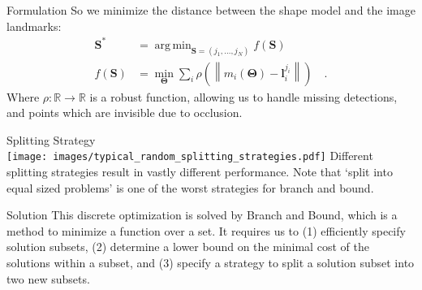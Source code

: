\documentclass[portrait,final,a0paper,fontscale=0.277]{baposter}
\newcommand*{\normLR}[1]{\left\| #1 \right\|}%
\newcommand*{\SET}[1]  {\ensuremath{\mathcal{#1}}}
\newcommand*{\VEC}[1]  {\ensuremath{\boldsymbol{#1}}}
\DeclareMathOperator*{\argmin}{arg\,min}
\newcommand{\SRR}{\ensuremath{\mathbb R}}
\renewcommand{\l}{\VEC l}
\newcommand{\J}{\SET{P}}
\newcommand{\Selection}{\mathbf{S}}
\newcommand{\AllSelections}{\mathfrak{S}}
\newcommand{\Params}{\VEC\Theta}
\begin{document}
\begin{poster}
\begin{posterbox}[name=formulation,column=0,below=contribution,above=references]{Formulation}
So we minimize the distance between the shape model and the image landmarks:
\begin{align}
  \Selection^* &= \argmin_{\Selection=(j_1, \dots, j_N)} f(\Selection)\nonumber\\
  f(\Selection) &= \min_{\Params} \sum_i \rho\left( \normLR{ m_i(\Params) - \l_i^{j_i} }\right)\quad.\label{eqn:cost}
\end{align}
Where $\rho: \SRR\to\SRR$ is a robust function, allowing us to handle missing
detections, and points which are invisible due to occlusion.
  \end{posterbox}
  \begin{posterbox}[name=strategy,column=1,above=bottom]{Splitting Strategy}
{\smaller{}\\[-0.5em]
\texttt{[image: images/typical\_random\_splitting\_strategies.pdf]}}
Different splitting strategies result in vastly different performance.
Note that  `split into equal sized problems' is one of the worst strategies for
branch and bound.
  \end{posterbox}
\begin{posterbox}[name=solution,column=1,row=0,below=results,above=strategy]{Solution}
  This discrete optimization is solved by Branch and Bound, which is a method to minimize a function over a set. It requires us to (1) efficiently specify solution subsets, (2) determine a lower bound on the minimal cost of the solutions within a subset, and (3) specify a strategy to split a solution subset into two new subsets.

\end{posterbox}
\end{poster}
\end{document}
